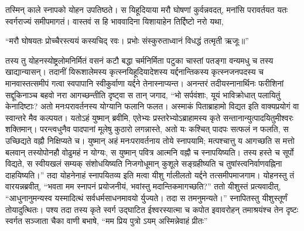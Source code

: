 \adhyAya
{}
\vakya तस्मिन् काले स्नापको योहन उपतिष्ठते। स यिहूदियाया मरौ घोषणां कुर्वन्नवदत्,
\vakya मनांसि परावर्तयत यतः स्वर्गराज्यं समीपमागतं।
\vakya वास्तवं स हि भाववादिना यिशायाहेन तिर्द्दिष्टो नरो यथा,
\begin{poem}
\startwithline “मरौ घोषयतः प्रोच्चैरस्त्ययं कस्यचिद् रवः।
\pline प्रभोः संस्कुरुताध्वानं विधद्धं तत्मृती ऋजूः॥”
\end{poem}
\vakya तस्य तु योहनस्योष्ट्रलोमनिर्मितं वसनं कटौ बद्धा चर्मनिर्मिता पटुका चास्तां पतङ्गा वन्यमधु च तस्य खाद्यान्यासन्।
\vakya तदानीं यिरूशालेमस्य कृत्स्नयिहूदियादेशस्य यर्द्दनान्तिकस्य
\vakya कृत्स्नजनपदस्य च मानवास्तत्समीपं गत्वा स्वपापानि स्वीकुर्वाणा यर्द्दने तेनास्नाप्यन्त।
\vakya अनन्तरं तदीयस्नानार्थिनः फरीशिनां सद्दूकिनाञ्च बहवो नरा आगच्छन्तीति दृष्ट्वा स तान् जगाद, “भो सर्पवंशाः, यूयं भाविक्रोधात् पलायितुं केनादिष्टाः?
\vakya अतो मनःपरावर्तनस्य योग्यानि फलानि फलत।
\vakya अस्माकं पिताब्राहामो विद्यत इति वाक्यप्रयोगं वा स्वान्तरे मैव कल्पयत। यतोऽहं युष्मान् ब्रवीमि, एतेभ्यः प्रस्तरेभ्योऽब्राहामस्य कृते सन्तानान्युत्पादयितुमीश्वरः शक्तिमान्।
\vakya परन्त्वधुनैव पादपानां मूलेषु कुठारो लगन्नास्ते, अतो यः कश्चित् पादपः सत्फलं न फलति, स उच्छिद्यते वह्नौ निक्षिप्यते च।
\vakya युष्मान् अहं मनःपरावर्तनाय तोये स्नापयामि; मत्पश्चात्तु य आगच्छति स मत्तो बलवान् तस्योपोनहौ वोढुमहं न योग्यः, स युष्मान् पवित्र आत्मनि वह्नौ च स्नापयिष्यति।
\vakya तस्य हस्ते च सूर्पो विद्यते, स स्वीयखलं सम्यक् संशोधयिष्यति निजगोधूमान् कुशूले सङ्ग्रहीष्यति च तुषांस्त्वनिर्वाणवह्निना दाहयिष्यति।”
\vakya तदा योहनेनाहं स्नापयितव्य इति मत्वा यीशु र्गालीलतो यर्द्दने तत्समीपमाजगाम।
\vakya योहनस्तु तं वारयन्नब्रवीत्, “भवता मम स्नापनं प्रयोजनीयं, भवांस्तु मदान्तिकमागच्छति?”
\vakya ततो यीशुस्तं प्रत्यवादीत्, “आधुनानुमन्यस्व यस्मादित्थं सर्वधर्मसाधनमावयो र्युज्यते। तदा स तमनुमन्यते।”
\vakya स्नापितस्तु यीशुस्तूर्णं तोयादुत्थितः। पश्य तदा तस्य कृते स्वर्ग उद्घाटित ईश्वरस्यात्मा च कपोत इवावरोहन् तमाश्रयंश्च तेन दृष्टः
\vakya स्वर्गत सञ्जाता चैका वाणी बभाषे, “मम प्रिय पुत्रो ऽयम् अस्मिन्नेवाहं प्रीतः”\eoc